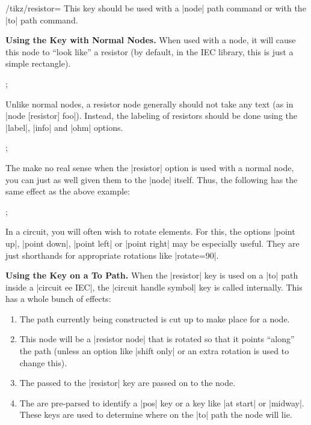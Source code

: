 \begin{key}{/tikz/resistor=}
    This key should be used with a |node| path command or with the |to| path
    command.

    \medskip\textbf{Using the Key with Normal Nodes.}
    When used with a node, it will cause this node to ``look like'' a resistor
    (by default, in the IEC library, this is just a simple rectangle).
\begin{codeexample}[]
  \node [resistor] {};
\end{codeexample}

    Unlike normal nodes, a resistor node generally should not take any text (as
    in |node [resistor] {foo}|). Instead, the labeling of resistors should be
    done using the |label|, |info| and |ohm| options.
\begin{codeexample}[]
  \node [resistor,ohm=5] {};
\end{codeexample}

    The  make no real sense when the |resistor| option is used
    with a normal node, you can just as well given them to the |node| itself.
    Thus, the following has the same effect as the above example:
\begin{codeexample}[]
  \node [resistor={ohm=5}] {};
\end{codeexample}

    In a circuit, you will often wish to rotate elements. For this, the options
    |point up|, |point down|, |point left| or |point right| may be especially
    useful. They are just shorthands for appropriate rotations like
    |rotate=90|.
\begin{codeexample}[]
\end{codeexample}

    \medskip\textbf{Using the Key on a To Path.}
    When the |resistor| key is used on a |to| path inside a |circuit ee IEC|,
    the |circuit handle symbol| key is called internally. This has a whole
    bunch of effects:
    \begin{enumerate}
        \item The path currently being constructed is cut up to make place for
            a node.
        \item This node will be a |resistor node| that is rotated so that it
            points ``along'' the path (unless an option like |shift only| or an
            extra rotation is used to change this).
        \item The  passed to the |resistor| key are passed on to
            the node.
        \item The  are pre-parsed to identify a |pos| key or a
            key like |at start| or |midway|. These keys are used to determine
            where on the |to| path the node will lie.
    \end{enumerate}


\end{key}
